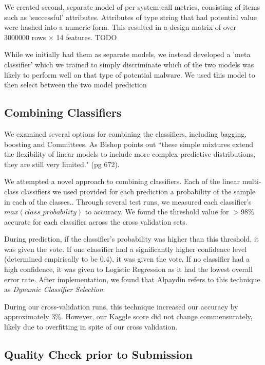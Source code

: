 \documentclass[11pt, oneside]{article}   	%
\begin{document}
We created second, separate model of per system-call metrics, consisting of items such as `successful' attributes. Attributes of type string that had potential value were hashed into a numeric form. This resulted in a design matrix of over 
3000000 rows $\times$ 14 features. TODO

While we initially had them as separate models, we instead developed a 'meta classifier' which we trained to simply discriminate which of the two models was likely to perform well on that type of potential malware. We used this model to then select between the two model prediction

\subsection*{Combining Classifiers}

We examined several options for combining the classifiers, including bagging, boosting and Committees. As Bishop points out ``these simple mixtures extend the flexibility of linear models to include more complex predictive distributions, they are still very limited." (pg 672).

We attempted a novel approach to combining classifiers. Each of the linear multi-class classifiers we used provided for each prediction a probability of the sample in each of the classes.\cite{sklearn}. Through several test runs, we measured each classifier's $max(class\_probability)$ to accuracy. We found the threshold value for $>$98\% accurate for each classifier across the cross validation sets. 

During prediction, if the classifier's probability was higher than this threshold, it was given the vote. If one classifier had a significantly higher confidence level (determined empirically to be 0.4), it was given the vote. If no classifier had a high confidence, it was given to Logistic Regression as it had the lowest overall error rate. After implementation, we found that Alpaydin refers to this technique as \emph{Dynamic Classifier Selection}.\cite{alpaydin}

During our cross-validation runs, this technique increased our accuracy by approximately 3\%. However, our Kaggle score did not change commensurately, likely due to overfitting in spite of our cross validation. 


\subsection*{Quality Check prior to Submission}
\end{document}
